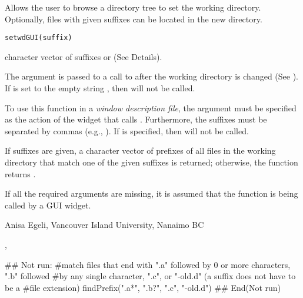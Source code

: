 \documentclass[letterpaper]{book}
\begin{document}
\begin{Description}\relax
Allows the user to browse a directory tree to set the working directory.
Optionally, files with given suffixes can be located in the new directory.
\end{Description}
\begin{Usage}
\begin{verbatim}
setwdGUI(suffix)
\end{verbatim}
\end{Usage}
\begin{Arguments}
\begin{ldescription}
\item[\code{suffix}] character vector of suffixes or  (See Details).
\end{ldescription}
\end{Arguments}
\begin{Details}\relax
The  argument is passed to a call to 
 after the working directory is changed 
(See ). If  is set to the empty
string , then  will not be called.

To use this function in a \emph{window description file}, 
the  argument must be specified as the action of 
the widget that calls . Furthermore, the
suffixes must be separated by commas (e.g., ). 
If  is specified, then  will not be called.
\end{Details}
\begin{Value}
If suffixes are given, a character vector of prefixes of all files in
the working directory that match one of the given suffixes is returned; 
otherwise, the function returns .
\end{Value}
\begin{Note}\relax
If all the required arguments are missing, it is assumed that the function
is being called by a GUI widget.
\end{Note}
\begin{Author}\relax
Anisa Egeli, Vancouver Island University, Nanaimo BC
\end{Author}
\begin{SeeAlso}\relax
{}, 
\end{SeeAlso}
\begin{Examples}
\begin{ExampleCode}
## Not run: 
#match files that end with ".a" followed by 0 or more characters, ".b" followed
#by any single character, ".c", or "-old.d" (a suffix does not have to be a
#file extension)
findPrefix(".a*", ".b?", ".c", "-old.d")
## End(Not run)
\end{ExampleCode}
\end{Examples}
\end{document}
